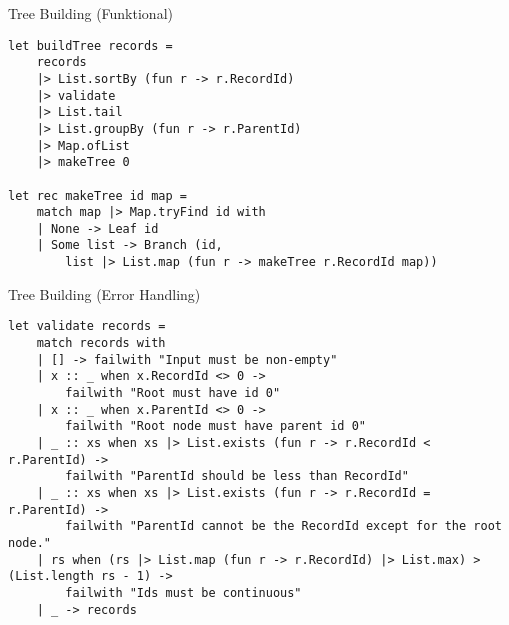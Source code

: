 \documentclass[t]{beamer}
\begin{document}
\begin{frame}[label={sec:orgc958f70},fragile]{Tree Building (Funktional)}
 \begin{verbatim}
let buildTree records = 
    records
    |> List.sortBy (fun r -> r.RecordId)
    |> validate
    |> List.tail
    |> List.groupBy (fun r -> r.ParentId)
    |> Map.ofList
    |> makeTree 0

let rec makeTree id map =
    match map |> Map.tryFind id with
    | None -> Leaf id
    | Some list -> Branch (id, 
        list |> List.map (fun r -> makeTree r.RecordId map))
\end{verbatim}
\end{frame}

\begin{frame}[label={sec:org365a5cd},fragile]{Tree Building (Error Handling)}
 \begin{verbatim}
let validate records =
    match records with
    | [] -> failwith "Input must be non-empty"
    | x :: _ when x.RecordId <> 0 -> 
        failwith "Root must have id 0"
    | x :: _ when x.ParentId <> 0 -> 
        failwith "Root node must have parent id 0"
    | _ :: xs when xs |> List.exists (fun r -> r.RecordId < r.ParentId) -> 
        failwith "ParentId should be less than RecordId"
    | _ :: xs when xs |> List.exists (fun r -> r.RecordId = r.ParentId) -> 
        failwith "ParentId cannot be the RecordId except for the root node."
    | rs when (rs |> List.map (fun r -> r.RecordId) |> List.max) > (List.length rs - 1) -> 
        failwith "Ids must be continuous"
    | _ -> records
\end{verbatim}
\end{frame}
\end{document}
